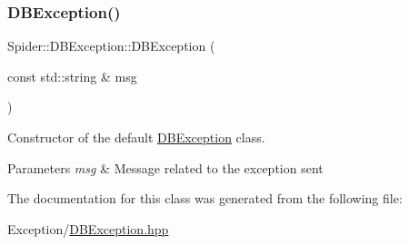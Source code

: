\subsubsection{\texorpdfstring{D\+B\+Exception()}{DBException()}}
{\footnotesize\ttfamily Spider\+::\+D\+B\+Exception\+::\+D\+B\+Exception (\begin{DoxyParamCaption}\item[{const std\+::string \&}]{msg }\end{DoxyParamCaption})\hspace{0.3cm}{\ttfamily [inline]}}



Constructor of the default \hyperlink{class_spider_1_1_d_b_exception}{D\+B\+Exception} class. 


\begin{DoxyParams}{Parameters}
{\em msg} & Message related to the exception sent \\
\hline
\end{DoxyParams}


The documentation for this class was generated from the following file\+:\begin{DoxyCompactItemize}
\item 
Exception/\hyperlink{_d_b_exception_8hpp}{D\+B\+Exception.\+hpp}\end{DoxyCompactItemize}

